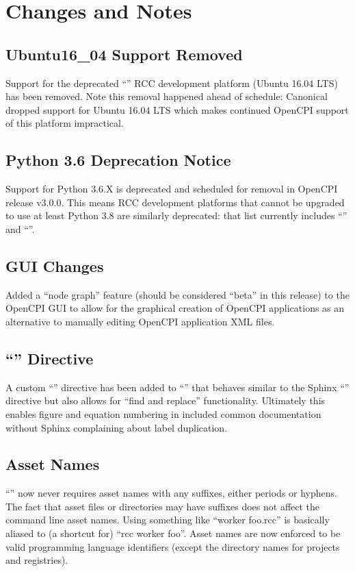 \section{Changes and Notes}

\subsection{Ubuntu16\_04 Support Removed}
\label{sec:25_ubuntu}
Support for the deprecated ``'' RCC development platform 
(Ubuntu 16.04 LTS) has been removed.  Note this removal happened ahead of schedule: Canonical dropped support for Ubuntu 16.04 LTS which makes continued OpenCPI support of this platform impractical.\\

\subsection{Python 3.6 Deprecation Notice}
\label{sec:25_python3}
Support for Python 3.6.X is deprecated and scheduled for removal in OpenCPI release v3.0.0.  This means RCC development platforms that cannot be upgraded to use at least Python 3.8 are similarly deprecated: that list currently includes ``'' and ``''.\\

\subsection{GUI Changes}
\label{sec:25_ie_gui}
Added a ``node graph'' feature (should be considered ``beta'' in this release) to the OpenCPI GUI to allow for the graphical creation of OpenCPI applications as an alternative to manually editing OpenCPI application XML files.\\

\subsection{ ``'' Directive}
\label{sec:25_ocpidoc}
A custom ``'' directive has been added to ``'' that behaves similar to the Sphinx ``'' directive but also allows for ``find and replace'' functionality. Ultimately this enables figure and equation numbering in included common documentation without Sphinx complaining about label duplication.\\

\subsection{ Asset Names}
\label{set:25_ocpidev_suffixes}
``'' now never requires asset names with any suffixes, either periods or hyphens.  The fact that asset files or directories may have suffixes does not affect the command line asset names.  Using something like ``worker foo.rcc'' is basically aliased to (a shortcut for) ``rcc worker foo''.  Asset names are now enforced to be valid programming language identifiers (except the directory names
for projects and registries).\\

